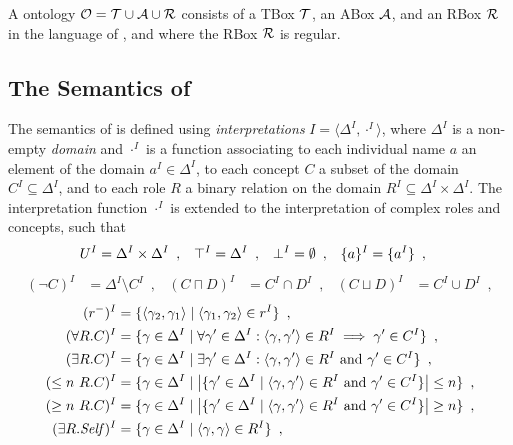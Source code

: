 
\begin{definition}
A \SROIQ  ontology $\mathcal{O} = \mathcal{T} \cup \mathcal{A} \cup \mathcal{R}$ consists of a TBox $\mathcal{T}$, an ABox $\mathcal{A}$, and an RBox $\mathcal{R}$ in the language of \SROIQ, and where the RBox $\mathcal{R}$ is regular.
\end{definition}

\subsection{The Semantics of \SROIQ} \label{sroiq-semantics}

The semantics of \SROIQ is defined using \emph{interpretations} $I = \langle \Delta^I, \cdot^I \rangle$, where $\Delta^I$ is a non-empty \emph{domain} and $\cdot^I$ is a function associating to each individual name $a$ an element of the domain $a^I \in \Delta^I$, to each concept $C$ a subset of the domain $C^I \subseteq \Delta^I$, and to each role $R$ a binary relation on the domain $R^I \subseteq \Delta^I \times \Delta^I$. The interpretation function $\cdot^I$ is extended to the interpretation of complex roles and concepts, such that
\begin{align*}
  U^I &= \Delta^I \times \Delta^I \enspace, &
  \top^I &= \Delta^I \enspace, &
  \bot^I &= \emptyset \enspace, &
  \{a\}^I &= \{ a^I \} \enspace,
\end{align*}
\vspace{-9mm}
\begin{align*}
  (\lnot C)^I &= \Delta^I \setminus C^I \enspace, &
  (C \sqcap D)^I &= C^I \cap D^I \enspace, &
  (C \sqcup D)^I &= C^I \cup D^I \enspace,
\end{align*} 
\vspace{-9mm}
\begin{align*}
  (r^-)^I &= \{ \langle \gamma_2, \gamma_1 \rangle \mid \langle \gamma_1, \gamma_2 \rangle \in r^I \} \enspace, \\
  (\forall R.C)^I &= \{ \gamma \in \Delta^I \mid \forall \gamma' \in \Delta^I : \langle \gamma, \gamma' \rangle \in R^I \implies \gamma' \in C^I \} \enspace, \\
  (\exists R.C)^I &= \{ \gamma \in \Delta^I \mid \exists \gamma' \in \Delta^I : \langle \gamma, \gamma' \rangle \in R^I \text{ and } \gamma' \in C^I \} \enspace, \\
  (\leq n~R.C)^I &= \{ \gamma \in \Delta^I \mid \left| \{ \gamma' \in \Delta^I \mid \langle \gamma, \gamma' \rangle \in R^I \text{ and } \gamma' \in C^I \} \right| \leq n \} \enspace, \\
  (\geq n~R.C)^I &= \{ \gamma \in \Delta^I \mid \left| \{ \gamma' \in \Delta^I \mid \langle \gamma, \gamma' \rangle \in R^I \text{ and } \gamma' \in C^I \} \right| \geq n \} \enspace, \\
  (\exists R.\mathit{Self})^I &= \{ \gamma \in \Delta^I \mid \langle \gamma, \gamma \rangle \in R^I \} \enspace,
\end{align*}
